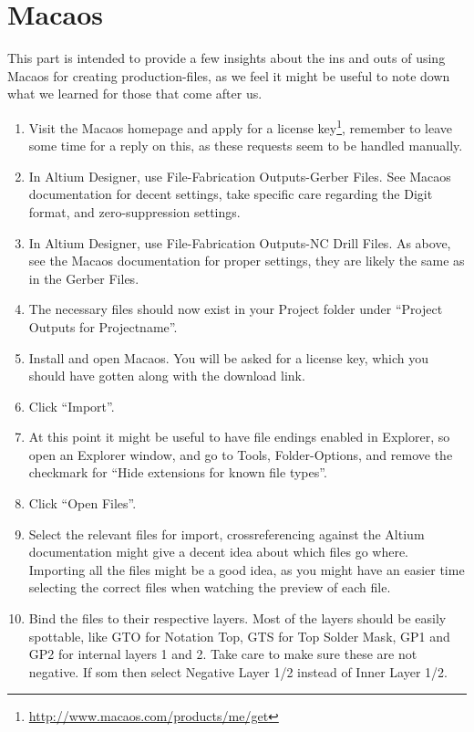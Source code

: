 \section{Macaos}\label{app:macaos}

This part is intended to provide a few insights about the ins and outs of using
Macaos for creating production-files, as we feel it might be useful to note down
what we learned for those that come after us.

\begin{enumerate}
\item Visit the Macaos homepage and apply for a license
  key\footnote{\url{http://www.macaos.com/products/me/get}}, remember to leave
  some time for a reply on this, as these requests seem to be handled manually.
\item In Altium Designer, use File-Fabrication Outputs-Gerber Files. See
  Macaos documentation for decent settings, take specific care regarding the
  Digit format, and zero-suppression settings.
\item In Altium Designer, use File-Fabrication Outputs-NC Drill Files. As above,
  see the Macaos documentation for proper settings, they are likely the same as
  in the Gerber Files.
\item The necessary files should now exist in your Project folder under
  ``Project Outputs for Projectname''.
\item Install and open Macaos. You will be asked for a license key, which you
  should have gotten along with the download link.
\item Click ``Import''.
\item At this point it might be useful to have file endings enabled in
  Explorer, so open an Explorer window, and go to Tools, Folder-Options, and
  remove the checkmark for ``Hide extensions for known file types''.
\item Click ``Open Files''.
\item Select the relevant files for import, crossreferencing against the
  Altium documentation might give a decent idea about which files go where.
  Importing all the files might be a good idea, as you might have an easier time
  selecting the correct files when watching the preview of each file.
\item Bind the files to their respective layers. Most of the layers should be
  easily spottable, like GTO for Notation Top, GTS for Top Solder Mask, GP1 and
  GP2 for internal layers 1 and 2. Take care to make sure these are not
  negative. If som then select Negative Layer 1/2 instead of Inner Layer 1/2.

\end{enumerate}
